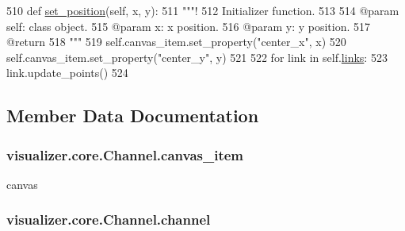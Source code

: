 \begin{DoxyCode}
510     \textcolor{keyword}{def }\hyperlink{classvisualizer_1_1core_1_1Channel_a1c867aded25c8b525413da8b645da0fb}{set\_position}(self, x, y):
511         \textcolor{stringliteral}{"""!}
512 \textcolor{stringliteral}{        Initializer function.}
513 \textcolor{stringliteral}{}
514 \textcolor{stringliteral}{        @param self: class object.}
515 \textcolor{stringliteral}{        @param x: x position.}
516 \textcolor{stringliteral}{        @param y: y position.}
517 \textcolor{stringliteral}{        @return}
518 \textcolor{stringliteral}{        """}
519         self.canvas\_item.set\_property(\textcolor{stringliteral}{"center\_x"}, x)
520         self.canvas\_item.set\_property(\textcolor{stringliteral}{"center\_y"}, y)
521 
522         \textcolor{keywordflow}{for} link \textcolor{keywordflow}{in} self.\hyperlink{classvisualizer_1_1core_1_1Channel_afc6affc9807a058f1fa442f1e9f77c5c}{links}:
523             link.update\_points()
524 
\end{DoxyCode}


\subsection{Member Data Documentation}
\subsubsection[{\texorpdfstring{canvas\+\_\+item}{canvas_item}}]{\setlength{\rightskip}{0pt plus 5cm}visualizer.\+core.\+Channel.\+canvas\+\_\+item}\hypertarget{classvisualizer_1_1core_1_1Channel_a37b0994d938c4e4d51ec4cbefc606ee1}{}\label{classvisualizer_1_1core_1_1Channel_a37b0994d938c4e4d51ec4cbefc606ee1}


canvas 

\subsubsection[{\texorpdfstring{channel}{channel}}]{\setlength{\rightskip}{0pt plus 5cm}visualizer.\+core.\+Channel.\+channel}\hypertarget{classvisualizer_1_1core_1_1Channel_a8f239a442e80fab3c2d40e4bd4683b15}{}\label{classvisualizer_1_1core_1_1Channel_a8f239a442e80fab3c2d40e4bd4683b15}


